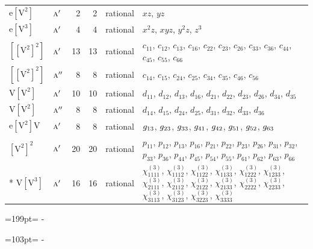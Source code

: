 \documentclass[10pt,a4paper]{article}
\newcommand{\needspace}[1]{\par\penalty-100\begingroup\dimen0=#1\relax\dimen2=\pagegoal
  \advance\dimen2-\pagetotal\ifdim\dimen0>\dimen2\relax\ifdim\dimen2>0pt\vfil\break\fi\fi
  \endgroup}
\numberwithin{equation}{section}
\newcommand{\irr}[1]{\text{\normalfont\scshape #1}}
\newcommand{\jahn}[1]{\mathrm{#1}}
\newlength{\fillwidth}\newlength{\cellwidth}\newlength{\colwidth}
\begin{document}
{\begin{longtable}{@{}llrrl>{\RaggedRight\arraybackslash}p{\fillwidth}@{}}
$\jahn{e[V^{2}]}$ & $\irr{a}'$ & 2 & 2 & rational & $xz$, $yz$\\
$\jahn{e[V^{3}]}$ & $\irr{a}'$ & 4 & 4 & rational & $x^{2}z$, $xyz$, $y^{2}z$, $z^{3}$\\
$\jahn{[[V^{2}]^{2}]}$ & $\irr{a}'$ & 13 & 13 & rational & $c_{11}$, $c_{12}$, $c_{13}$, $c_{16}$, $c_{22}$, $c_{23}$, $c_{26}$, $c_{33}$, $c_{36}$, $c_{44}$, $c_{45}$, $c_{55}$, $c_{66}$\\
$\jahn{[[V^{2}]^{2}]}$ & $\irr{a}''$ & 8 & 8 & rational & $c_{14}$, $c_{15}$, $c_{24}$, $c_{25}$, $c_{34}$, $c_{35}$, $c_{46}$, $c_{56}$\\
$\jahn{V[V^{2}]}$ & $\irr{a}'$ & 10 & 10 & rational & $d_{11}$, $d_{12}$, $d_{13}$, $d_{16}$, $d_{21}$, $d_{22}$, $d_{23}$, $d_{26}$, $d_{34}$, $d_{35}$\\
$\jahn{V[V^{2}]}$ & $\irr{a}''$ & 8 & 8 & rational & $d_{14}$, $d_{15}$, $d_{24}$, $d_{25}$, $d_{31}$, $d_{32}$, $d_{33}$, $d_{36}$\\
$\jahn{e[V^{2}]V}$ & $\irr{a}'$ & 8 & 8 & rational & $\mathnormal{g}_{13}$, $\mathnormal{g}_{23}$, $\mathnormal{g}_{33}$, $\mathnormal{g}_{41}$, $\mathnormal{g}_{42}$, $\mathnormal{g}_{51}$, $\mathnormal{g}_{52}$, $\mathnormal{g}_{63}$\\
$\jahn{[V^{2}]^{2}}$ & $\irr{a}'$ & 20 & 20 & rational & $p_{11}$, $p_{12}$, $p_{13}$, $p_{16}$, $p_{21}$, $p_{22}$, $p_{23}$, $p_{26}$, $p_{31}$, $p_{32}$, $p_{33}$, $p_{36}$, $p_{44}$, $p_{45}$, $p_{54}$, $p_{55}$, $p_{61}$, $p_{62}$, $p_{63}$, $p_{66}$\\*
$\jahn{V[V^{3}]}$ & $\irr{a}'$ & 16 & 16 & rational & $\chi^{(3)}_{1111}$, $\chi^{(3)}_{1112}$, $\chi^{(3)}_{1122}$, $\chi^{(3)}_{1133}$, $\chi^{(3)}_{1222}$, $\chi^{(3)}_{1233}$, $\chi^{(3)}_{2111}$, $\chi^{(3)}_{2112}$, $\chi^{(3)}_{2122}$, $\chi^{(3)}_{2133}$, $\chi^{(3)}_{2222}$, $\chi^{(3)}_{2233}$, $\chi^{(3)}_{3113}$, $\chi^{(3)}_{3123}$, $\chi^{(3)}_{3223}$, $\chi^{(3)}_{3333}$\\
\bottomrule\end{longtable}}
\needspace{199pt}
\needspace{103pt}
\end{document}
